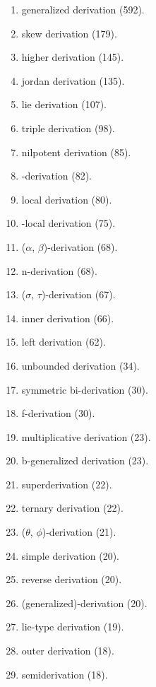 \begin{enumerate}
\item \allowbreak generalized derivation \hfill(592).
\item \allowbreak skew derivation \hfill(179).
\item \allowbreak higher derivation \hfill(145).
\item \allowbreak jordan derivation \hfill(135).
\item \allowbreak lie derivation \hfill(107).
\item \allowbreak triple derivation \hfill(98).
\item \allowbreak nilpotent derivation \hfill(85).
\item \allowbreak *-derivation \hfill(82).
\item \allowbreak local derivation \hfill(80).
\item {}-local derivation \hfill(75).
\item \allowbreak ($\alpha$, $\beta$)-derivation \hfill(68).
\item \allowbreak n-derivation \hfill(68).
\item \allowbreak ($\sigma$, $\tau$)-derivation \hfill(67).
\item \allowbreak inner derivation \hfill(66).
\item \allowbreak left derivation \hfill(62).
\item \allowbreak unbounded derivation \hfill(34).
\item \allowbreak symmetric bi-derivation \hfill(30).
\item \allowbreak f-derivation \hfill(30).
\item \allowbreak multiplicative derivation \hfill(23).
\item \allowbreak b-generalized derivation \hfill(23).
\item \allowbreak superderivation \hfill(22).
\item \allowbreak ternary derivation \hfill(22).
\item \allowbreak ($\theta$, $\phi$)-derivation \hfill(21).
\item \allowbreak simple derivation \hfill(20).
\item \allowbreak reverse derivation \hfill(20).
\item \allowbreak (generalized)-derivation \hfill(20).
\item \allowbreak lie-type derivation \hfill(19).
\item \allowbreak outer derivation \hfill(18).
\item \allowbreak semiderivation \hfill(18).

\end{enumerate}
